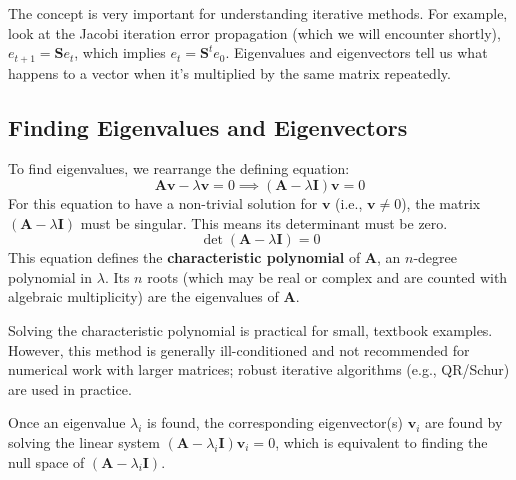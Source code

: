 The concept is very important for understanding iterative methods. For example, look at the Jacobi iteration error propagation (which we will encounter shortly), $e_{t+1} = \mathbf{S}e_t$, which implies $e_t = \mathbf{S}^t e_0$. Eigenvalues and eigenvectors tell us what happens to a vector when it's multiplied by the same matrix repeatedly.

\subsection{Finding Eigenvalues and Eigenvectors}

To find eigenvalues, we rearrange the defining equation:
$$ \mathbf{A}\mathbf{v} - \lambda \mathbf{v} = 0 \implies (\mathbf{A} - \lambda \mathbf{I})\mathbf{v} = 0 $$
For this equation to have a non-trivial solution for $\mathbf{v}$ (i.e., $\mathbf{v} \neq 0$), the matrix $(\mathbf{A} - \lambda \mathbf{I})$ must be singular. This means its determinant must be zero.
$$ \det(\mathbf{A} - \lambda \mathbf{I}) = 0 $$
This equation defines the \textbf{characteristic polynomial} of $\mathbf{A}$, an $n$-degree polynomial in $\lambda$. Its $n$ roots (which may be real or complex and are counted with algebraic multiplicity) are the eigenvalues of $\mathbf{A}$.

Solving the characteristic polynomial is practical for small, textbook examples. However, this method is generally ill-conditioned and not recommended for numerical work with larger matrices; robust iterative algorithms (e.g., QR/Schur) are used in practice.

Once an eigenvalue $\lambda_i$ is found, the corresponding eigenvector(s) $\mathbf{v}_i$ are found by solving the linear system $(\mathbf{A} - \lambda_i \mathbf{I})\mathbf{v}_i = 0$, which is equivalent to finding the null space of $(\mathbf{A} - \lambda_i \mathbf{I})$.

